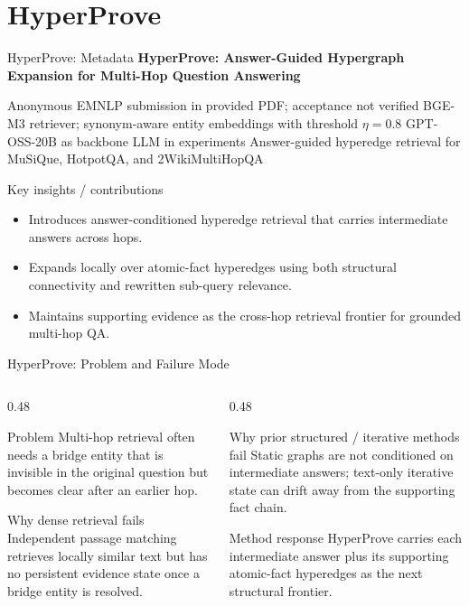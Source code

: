 \section{HyperProve}

\begin{frame}{HyperProve: Metadata}
\small
\textbf{HyperProve: Answer-Guided Hypergraph Expansion for Multi-Hop Question Answering}

\paperinfo
{Anonymous EMNLP submission in provided PDF; acceptance not verified}
{BGE-M3 retriever; synonym-aware entity embeddings with threshold $\eta=0.8$}
{GPT-OSS-20B as backbone LLM in experiments}
{Answer-guided hyperedge retrieval for MuSiQue, HotpotQA, and 2WikiMultiHopQA}

\begin{block}{Key insights / contributions}
\scriptsize
\begin{itemize}
  \item Introduces answer-conditioned hyperedge retrieval that carries intermediate answers across hops.
  \item Expands locally over atomic-fact hyperedges using both structural connectivity and rewritten sub-query relevance.
  \item Maintains supporting evidence as the cross-hop retrieval frontier for grounded multi-hop QA.
\end{itemize}
\end{block}
\end{frame}

\begin{frame}{HyperProve: Problem and Failure Mode}
\scriptsize
\begin{columns}[T,onlytextwidth]
  \begin{column}{0.48\textwidth}
    \begin{block}{Problem}
      Multi-hop retrieval often needs a bridge entity that is invisible in the original question but becomes clear after an earlier hop.
    \end{block}
    \begin{block}{Why dense retrieval fails}
      Independent passage matching retrieves locally similar text but has no persistent evidence state once a bridge entity is resolved.
    \end{block}
  \end{column}
  \begin{column}{0.48\textwidth}
    \begin{block}{Why prior structured / iterative methods fail}
      Static graphs are not conditioned on intermediate answers; text-only iterative state can drift away from the supporting fact chain.
    \end{block}
    \begin{block}{Method response}
      HyperProve carries each intermediate answer plus its supporting atomic-fact hyperedges as the next structural frontier.
    \end{block}
  \end{column}
\end{columns}
\end{frame}

